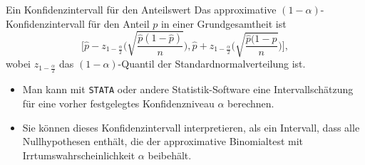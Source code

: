 \documentclass[usenames,dvipsnames,handout]{beamer}
\begin{document}
\begin{frame}{Ein Konfidenzintervall für den Anteilswert}
Das approximative $(1-\alpha)$-Konfidenzintervall für den Anteil $p$ in einer Grundgesamtheit ist
\begin{equation}
\label{eq:1}
\bigg[\hat{p} - z_{1-\frac{\alpha}{2}}\Bigg(\sqrt{\frac{\hat{p}(1-\hat{p})}{n}}\Bigg),\hat{p} + z_{1-\frac{\alpha}{2}}\Bigg(\sqrt{\frac{\hat{p}(1-\hat{p}}{n}}\Bigg) \Bigg],
\end{equation}
 wobei $z_{1-\frac{\alpha}{2}}$ das $(1-\alpha)$-Quantil der Standardnormalverteilung ist.\pause
\begin{itemize}
\item{Man kann mit \texttt{STATA} oder andere Statistik-Software eine Intervallschätzung
für eine vorher festgelegtes Konfidenzniveau $\alpha$ berechnen.}
\item{Sie können dieses Konfidenzintervall interpretieren, als ein Intervall,
dass alle Nullhypothesen enthält, die der approximative Binomialtest mit Irrtumswahrscheinlichkeit $\alpha$ beibehält.}\pause

\end{itemize}
\end{frame}
\end{document}
